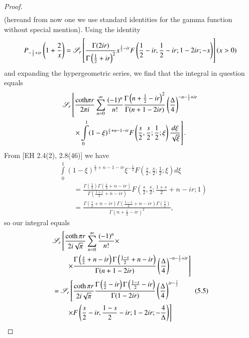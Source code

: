 \begin{proof}
\begin{align*}
\end{align*}
(here\pageoriginale and from now one we use standard identities for the gamma function without special mention). Using the identity 
{\fontsize{10}{12}\selectfont
$$
P_{-\frac{1}{2} + ir} \left(1+\frac{2}{x} \right) = \mathscr{S}_r 
\left[ \frac{\Gamma (2 ir)}{\Gamma \left(\frac{1}{2} + ir \right)^2} x^{\frac{1}{2} -ir} F \left(\frac{1}{2}  - ir ,\frac{1}{2}- ir; 1-2 ir; -x \right)\right] (x >0)
$$}\relax
[EH 3.2 (19)] and expanding the hypergeometric series, we find that the integral in question equals 
\begin{multline*}
\mathscr{S}_r \left[\frac{\text{coth} \pi r}{2 \pi i} \sum\limits^\infty_{n=0} \frac{(-1)^n}{n!} \frac{\Gamma \left(n+ \frac{1}{2} - ir \right)^2}{\Gamma (n+1 - 2 i r)} \left(\frac{\Delta}{4} \right)^{-n -\frac{1}{2} + ir}  \right.\\
\left.  \times \int\limits^1_0 (1-\xi)^{\frac{s}{2} + n -1 - ir} F\left(\frac{s}{2}, \frac{s}{2}; \frac{1}{2}; \xi \right) \frac{d\xi}{\sqrt{\xi}} \right].
\end{multline*}
From [EH 2.4(2), 2.8(46)] we have 
\begin{align*}
& \int\limits^1_0 (1-\xi)^{\frac{s}{2} + n - 1 - ir} \xi^{-\frac{1}{2}} F\left(\frac{s}{2}, \frac{s}{2} ; \frac{1}{2}; \xi  \right) d \xi\\
&\qquad = \frac{\Gamma \left(\frac{1}{2} \right)  \Gamma \left(\frac{s}{2}+ n - ir \right)}{
\Gamma \left(\frac{1+s}{2} + n - ir \right)} F \left(\frac{s}{2} , \frac{s}{2}; \frac{1+s}{2} + n -ir; 1 \right) \\
&\qquad = \frac{\Gamma \left(\frac{s}{2} + n - ir \right) \Gamma \left(\frac{1-s}{2} + n - ir \right) \Gamma \left(\frac{1}{2} \right)}{\Gamma \left(n+ \frac{1}{2} -ir \right)^2},
\end{align*}
so our integral equals 
\begin{align*}
& \sS_r \left[ \frac{\coth \pi r}{2 i \sqrt{\pi}} \sum\limits^\infty_{n=0} \frac{(-1)^n}{n!}  \times  \right.\\
& \qquad \left.\times \frac{\Gamma \left(\frac{s}{2} + n - ir \right)\Gamma \left(\frac{1-s}{2} + n - ir \right)}{\Gamma (n+ 1 - 2 ir)} \left(\frac{\Delta}{4} \right)^{-n -\frac{1}{2} + ir} \right]\\
& = \sS_r \left[ \frac{\coth \pi r }{2i \sqrt{\pi}} \frac{\Gamma \left(\frac{s}{2} - ir \right) \Gamma \left(\frac{1-s}{2} - ir \right)}{\Gamma (1 - 2 ir)} \left(\frac{\Delta}{4} \right)^{ir - \frac{1}{2}}\right. \tag{5.5}\label{art11-eq5.5}\\
&\quad \quad \left.  \times F \left(\frac{s}{2} - ir , \frac{1-s}{2} - ir; 1 - 2 ir ; -\frac{4}{\Delta} \right)\right]\\

\end{align*}
\end{proof}
